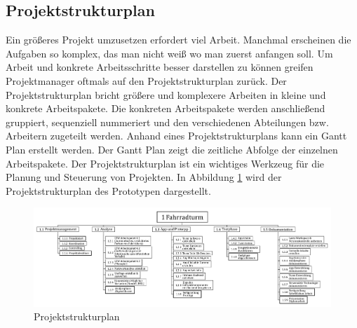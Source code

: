 \subsection{Projektstrukturplan}

Ein größeres Projekt umzusetzen erfordert viel Arbeit. Manchmal erscheinen die Aufgaben so komplex, das man nicht weiß wo man zuerst anfangen soll. Um Arbeit und konkrete Arbeitsschritte besser darstellen zu können greifen Projektmanager oftmals auf den Projektstrukturplan zurück. Der Projektstrukturplan bricht größere und komplexere Arbeiten in kleine und konkrete Arbeitspakete. Die konkreten Arbeitspakete werden anschließend gruppiert, sequenziell nummeriert und den verschiedenen Abteilungen bzw. Arbeitern zugeteilt werden. Anhand eines Projektstrukturplans kann ein Gantt Plan erstellt werden. Der Gantt Plan zeigt die zeitliche Abfolge der einzelnen Arbeitspakete. Der Projektstrukturplan ist ein wichtiges Werkzeug für die Planung und Steuerung von Projekten. In Abbildung \ref{fig:projektstrukturplan} wird der Projektstrukturplan des Prototypen dargestellt.

\begin{figure}[H]
  \centering
  \includegraphics[width=1\textwidth]{images/projektstrukturplan}
  \caption{Projektstrukturplan}
  \label{fig:projektstrukturplan}
\end{figure}

